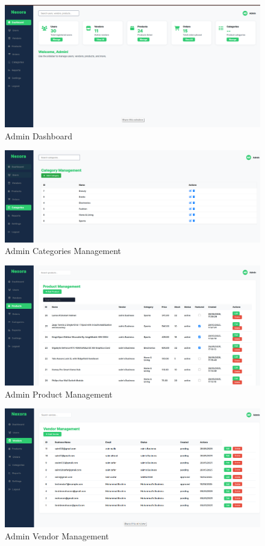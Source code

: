 \begin{figure}[htbp]
\centering
\includegraphics[width=\textwidth,keepaspectratio]{thesis/figures/admin-dashboard.png}
\caption{Admin Dashboard}
\label{fig:admin-dashboard}
\end{figure}

\begin{figure}[htbp]
\centering
\includegraphics[width=\textwidth,keepaspectratio]{thesis/figures/admin-categories.png}
\caption{Admin Categories Management}
\label{fig:admin-categories}
\end{figure}

\begin{figure}[htbp]
\centering
\includegraphics[width=\textwidth,keepaspectratio]{thesis/figures/admin-products-management.png}
\caption{Admin Product Management}
\label{fig:admin-products}
\end{figure}

\begin{figure}[htbp]
\centering
\includegraphics[width=\textwidth,keepaspectratio]{thesis/figures/admin-vendor-management.png}
\caption{Admin Vendor Management}
\label{fig:admin-vendors}
\end{figure}